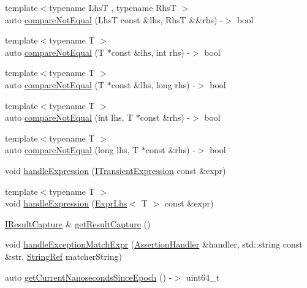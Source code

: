 \begin{DoxyCompactItemize}
\item 
{\footnotesize template$<$typename Lhs\-T , typename Rhs\-T $>$ }\\auto \hyperlink{namespace_catch_a8bec217f5ef5f09c17074c311c958f3c}{compare\-Not\-Equal} (Lhs\-T const \&lhs, Rhs\-T \&\&rhs) -\/$>$ bool
\item 
{\footnotesize template$<$typename T $>$ }\\auto \hyperlink{namespace_catch_aa81c95898f22dce1f61d7710e495d1ee}{compare\-Not\-Equal} (T $\ast$const \&lhs, int rhs) -\/$>$ bool
\item 
{\footnotesize template$<$typename T $>$ }\\auto \hyperlink{namespace_catch_adad6539b3780b9a8953221efd038e2e4}{compare\-Not\-Equal} (T $\ast$const \&lhs, long rhs) -\/$>$ bool
\item 
{\footnotesize template$<$typename T $>$ }\\auto \hyperlink{namespace_catch_adb4b3e912b89a987025ca28cf0c92ba8}{compare\-Not\-Equal} (int lhs, T $\ast$const \&rhs) -\/$>$ bool
\item 
{\footnotesize template$<$typename T $>$ }\\auto \hyperlink{namespace_catch_a3db634a0adf44a1148767ba149ccf34d}{compare\-Not\-Equal} (long lhs, T $\ast$const \&rhs) -\/$>$ bool
\item 
void \hyperlink{namespace_catch_a65af25091f2ab61056e166765963e525}{handle\-Expression} (\hyperlink{struct_catch_1_1_i_transient_expression}{I\-Transient\-Expression} const \&expr)
\item 
{\footnotesize template$<$typename T $>$ }\\void \hyperlink{namespace_catch_af2c93db76668a981e75ae835699efce7}{handle\-Expression} (\hyperlink{class_catch_1_1_expr_lhs}{Expr\-Lhs}$<$ T $>$ const \&expr)
\item 
\hyperlink{struct_catch_1_1_i_result_capture}{I\-Result\-Capture} \& \hyperlink{namespace_catch_aff60c1de6ac6cea30175d70e33d83c8e}{get\-Result\-Capture} ()
\item 
void \hyperlink{namespace_catch_a53ff6b1a7152359be73802b6f121fef0}{handle\-Exception\-Match\-Expr} (\hyperlink{class_catch_1_1_assertion_handler}{Assertion\-Handler} \&handler, std\-::string const \&str, \hyperlink{class_catch_1_1_string_ref}{String\-Ref} matcher\-String)
\item 
auto \hyperlink{namespace_catch_a98d058468488c486a9cb5c8463f3ba29}{get\-Current\-Nanoseconds\-Since\-Epoch} () -\/$>$ uint64\-\_\-t
\item 

\end{DoxyCompactItemize}
